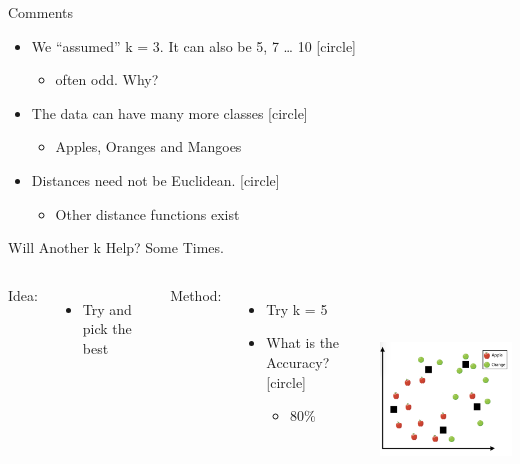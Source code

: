 \documentclass[aspectratio=169,14pt,usenames,dvipsnames]{beamer}
\begin{document}
\begin{frame}{Comments}
\begin{itemize}
\item We “assumed” k = 3. It can also be 5, 7 … 10 
[circle]
\begin{itemize}
\item often odd. Why?
\end{itemize}
\item The data can have many more classes
[circle]
\begin{itemize}
\item Apples, Oranges and Mangoes
\end{itemize}
\item Distances need not be Euclidean. 
[circle]
\begin{itemize}
\item Other distance functions exist
\end{itemize}
\end{itemize}
\end{frame}


\begin{frame}{Will Another k Help? Some Times.}
\begin{columns}
\alert{Idea:}
\begin{itemize}
  \item Try and pick the best
\end{itemize}
\alert{Method:}
\begin{itemize}
\item Try k = 5
\item What is the Accuracy?
[circle]
\begin{itemize}
\item<2> 80\%
\end{itemize}
\end{itemize}
\includegraphics[width=7cm, height=6cm]{Images/9knn.png}
\end{columns}
\end{frame}
\end{document}
